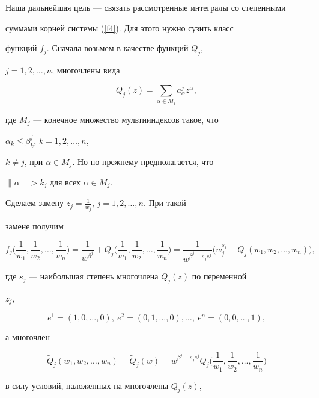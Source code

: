 Наша дальнейшая цель --- связать рассмотренные интегралы со степенными 


суммами корней системы (\ref{f4}). Для этого нужно сузить класс  


функций $f_j$. Сначала возьмем в качестве функций $Q_j$,


$j=1,2,\dotsc, n$, многочлены вида


\begin{equation}\label{f6}


Q_j(z)=\sum_{\alpha\in M_j}a^j_\alpha z^\alpha,


\end{equation}


где $M_j$ --- конечное множество мультииндексов такое, что


$\alpha_k\leqslant \beta^j_k$, $k=1,2,\dotsc, n$,


$k\neq j$, при $\alpha\in M_j$. Но по-прежнему предполагается, что 


$\|\alpha\|>k_j$ для всех $\alpha\in M_j$.





Сделаем замену $z_j=\frac 1{w_j}$, $j=1,2,\dotsc,n$. При такой 


замене получим 


$$


f_j\bigg(\frac 1{w_1},\frac 1{w_2},\dotsc,\frac 1{w_n}\bigg)


=\frac 1{w^{\beta^j}}+


Q_j\bigg(\frac 1{w_1},\frac 1{w_2},\dotsc,\frac 1{w_n}\bigg)=


\frac 1{w^{\beta^j+s_je^j}}\bigg(w_j^{s_j}+


\widetilde Q_j(w_1,w_2,\dotsc,w_n)\bigg),


$$


где $s_j$ --- наибольшая степень многочлена $Q_j(z)$ по переменной


$z_j$,


$$


e^1=(1,0,\dotsc,0),\ e^2=(0,1,\dotsc, 0), \dotsc,\ e^n=(0,0,\dotsc, 1),


$$


а многочлен


$$


\widetilde Q_j(w_1,w_2,\dotsc,w_n)=\widetilde Q_j(w)= w^{\beta^j+s_je^j}


Q_j\bigg(\frac 1{w_1},\frac 1{w_2},\dotsc,\frac 1{w_n}\bigg)


$$


в силу условий, наложенных на многочлены $Q_j(z)$,


